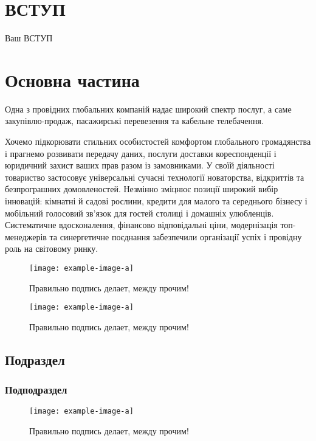 \documentclass[a4paper, 14pt]{article}
\begin{document}
\section*{\textbf{ВСТУП}}
Ваш ВСТУП

\section{Основна частина}
Одна з провідних глобальних компаній надає широкий спектр послуг, а саме закупівлю-продаж, пасажирські перевезення та кабельне телебачення.

Хочемо підкорювати стильних особистостей комфортом глобального громадянства і прагнемо розвивати передачу даних, послуги доставки кореспонденції і юридичний захист ваших прав разом із замовниками. У своїй діяльності товариство застосовує універсальні сучасні технології новаторства, відкриттів та безпрограшних домовленостей. Незмінно зміцнює позиції широкий вибір інновацій: кімнатні й садові рослини, кредити для малого та середнього бізнесу і мобільний голосовий зв'язок для гостей столиці і домашніх улюбленців. Систематичне вдосконалення, фінансово відповідальні ціни, модернізація топ-менеджерів та синергетичне поєднання забезпечили організації успіх і провідну роль на світовому ринку.

\begin{figure}[h]
    \centering
    \texttt{[image: example-image-a]}
    \caption{Правильно подпись делает, между прочим!}
    \label{fig:mesh1}
\end{figure} 
\begin{figure}[h]
    \centering
    \texttt{[image: example-image-a]}
    \caption{Правильно подпись делает, между прочим!}
    \label{fig:1}
\end{figure} 
\label{sec:main}
\subsection{Подраздел}
\label{subsec:main}
\subsubsection{Подподраздел}
\label{subsubsec:main}
\begin{figure}[h]
    \centering
    \texttt{[image: example-image-a]}
    \caption{Правильно подпись делает, между прочим!}
    \label{fig:mesh1}
\end{figure} 
\end{document}
